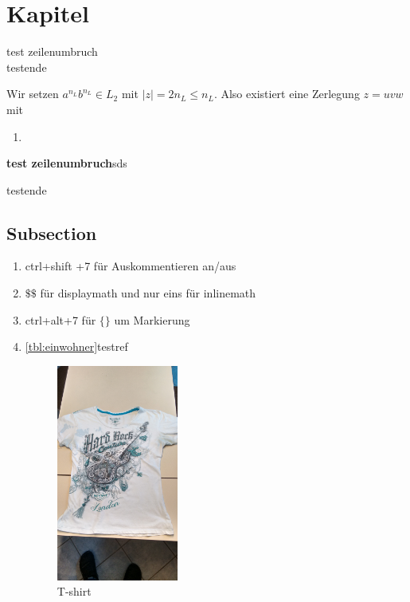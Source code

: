 \documentclass{scrartcl}
\begin{document}
\tableofcontents
{}

\section{Kapitel}
test zeilenumbruch\\
testende

Wir setzen \(a^{n_{L}}b^{n_{L}}\in L_2 \) mit \(|z|=2n_{L}\leq n_L\). Also existiert eine Zerlegung \(z=uvw\) mit



\begin{enumerate}
  \item
\end{enumerate}


\textbf{test zeilenumbruch}sds

testende

\subsection{Subsection}
\begin{enumerate}
 \item
       ctrl+shift +7 für Auskommentieren an/aus
 \item
       \(\$\$\) für displaymath und nur eins für inlinemath
 \item
       ctrl+alt+7 für \(\{\}\) um Markierung
 \item
       \ref{tbl:einwohner}testref

       \begin{figure}
        \begin{center}
         \includegraphics[width=4cm]{testbild.jpg}
        \end{center}
        \caption{T-shirt}
        \label{fig: tshirt}
       \end{figure}



\end{enumerate}
\end{document}
